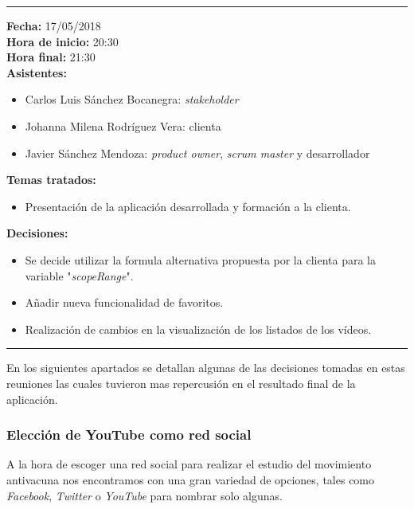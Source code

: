 \documentclass[11pt,a4paper]{article}
\begin{document}
\begin{center}\rule{10cm}{0.4pt}\end{center}

\noindent\textbf{Fecha:} 17/05/2018
\\
\noindent\textbf{Hora de inicio:} 20:30
\\
\noindent\textbf{Hora final:} 21:30
\\
\noindent\textbf{Asistentes:} 
\begin{itemize}
\item Carlos Luis Sánchez Bocanegra: \textit{stakeholder}
\item Johanna Milena Rodríguez Vera: clienta
\item Javier Sánchez Mendoza: \textit{product owner}, \textit{scrum master} y desarrollador
\end{itemize}
\noindent\textbf{Temas tratados:}
\begin{itemize}
\item Presentación de la aplicación desarrollada y formación a la clienta.
\end{itemize}
\noindent\textbf{Decisiones:}
\begin{itemize}
\item Se decide utilizar la formula alternativa propuesta por la clienta para la variable "\textit{scopeRange}".
\item Añadir nueva funcionalidad de favoritos.
\item Realización de cambios en la visualización de los listados de los vídeos.
\end{itemize}

\begin{center}\rule{10cm}{0.4pt}\end{center}

En los siguientes apartados se detallan algunas de las decisiones tomadas en estas reuniones las cuales tuvieron mas repercusión en el resultado final de la aplicación.
\medskip 

\subsubsection{Elección de YouTube como red social}
A la hora de escoger una red social para realizar el estudio del movimiento antivacuna nos encontramos con una gran variedad de opciones, tales como \textit{Facebook}, \textit{Twitter} o \textit{YouTube} para nombrar solo algunas.
\\
\end{document}
